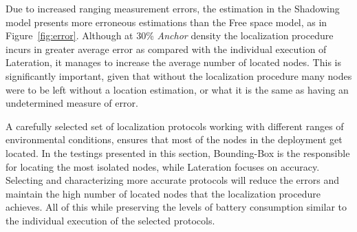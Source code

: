 Due to increased ranging measurement errors, the estimation in the Shadowing model presents more erroneous estimations than the Free space model, as in Figure~\ref{fig:error}. Although at $30$\% \emph{Anchor} density the localization procedure incurs in greater average error as compared with the individual execution of Lateration, it manages to increase the average number of located nodes. This is significantly important, given that without the localization procedure many nodes were to be left without a location estimation, or what it is the same as having an undetermined measure of error.

A carefully selected set of localization protocols working with different ranges of environmental conditions, ensures that most of the nodes in the deployment get located. In the testings presented in this section, Bounding-Box is the responsible for locating the most isolated nodes, while Lateration focuses on accuracy. Selecting and characterizing more accurate protocols will reduce the errors and maintain the high number of located nodes that the localization procedure achieves. All of this while preserving the levels of battery consumption similar to the individual execution of the selected protocols.